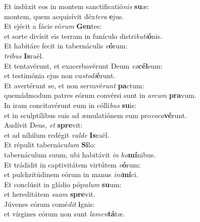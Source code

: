 \oddverse Et indúxit eos in montem sanctificatió\textit{nis} \textbf{su}æ:~\*\\
\oddverse montem, quem acquisívit déx\textit{te}\textit{ra} \textbf{e}jus.\\
\evenverse Et ejécit a fácie eó\textit{rum} \textbf{Gen}tes:~\*\\
\evenverse et sorte divísit eis terram in funículo distri\textit{bu}\textit{ti}\textbf{ó}nis.\\
\oddverse Et habitáre fecit in tabernáculis \textit{e}\textbf{ó}rum:~\*\\
\oddverse \textit{tri}\textit{bus} \textbf{Is}raël.\\
\evenverse Et tentavérunt, et exacerbavérunt Deum \textit{ex}\textbf{cél}sum:~\*\\
\evenverse et testimónia ejus non cu\textit{sto}\textit{di}\textbf{é}runt.\\
\oddverse Et avertérunt se, et non servavé\textit{runt} \textbf{pa}ctum:~\*\\
\oddverse quemádmodum patres eórum convérsi sunt in \textit{ar}\textit{cum} \textbf{pra}vum.\\
\evenverse In iram concitavérunt eum in cólli\textit{bus} \textbf{su}is:~\*\\
\evenverse et in sculptílibus suis ad æmulatiónem eum pro\textit{vo}\textit{ca}\textbf{vé}runt.\\
\oddverse Audívit Deus, \textit{et} \textbf{spre}vit:~\*\\
\oddverse et ad níhilum redégit \textit{val}\textit{de} \textbf{Is}raël.\\
\evenverse Et répulit tabernácu\textit{lum} \textbf{Si}lo:~\*\\
\evenverse tabernáculum suum, ubi habitávit \textit{in} \textit{ho}\textbf{mí}nibus.\\
\oddverse Et trádidit in captivitátem virtútem \textit{e}\textbf{ó}rum:~\*\\
\oddverse et pulchritúdinem eórum in manus \textit{i}\textit{ni}\textbf{mí}ci.\\
\evenverse Et conclúsit in gládio pópu\textit{lum} \textbf{su}um:~\*\\
\evenverse et hereditátem \textit{su}\textit{am} \textbf{spre}vit.\\
\oddverse Júvenes eórum comé\textit{dit} \textbf{i}gnis:~\*\\
\oddverse et vírgines eórum non sunt \textit{la}\textit{men}\textbf{tá}tæ.\\
